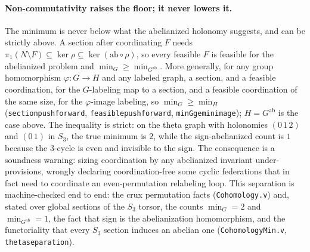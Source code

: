 \documentclass[11pt,a4paper]{article}
\theoremstyle{plain}
\theoremstyle{definition}
\theoremstyle{remark}
\renewcommand{\_}{\origunderscore\allowbreak}
\begin{document}
\paragraph{Non-commutativity raises the floor; it never lowers it.} The minimum is never below what
the abelianized holonomy suggests, and can be strictly above. A section after coordinating $F$ needs
$\pi_1(N \setminus F) \subseteq \ker \rho \subseteq \ker(\mathrm{ab} \circ \rho)$, so every feasible
$F$ is feasible for the abelianized problem and $\min_G \ge \min_{G^{\mathrm{ab}}}$. More generally,
for any group homomorphism $\varphi : G \to H$ and any labeled graph, a section, and a feasible
coordination, for the $G$-labeling map to a section, and a feasible coordination of the same size, for
the $\varphi$-image labeling, so $\min_G \ge \min_H$ (\texttt{section\_pushforward},
\texttt{feasible\_pushforward}, \texttt{min\_G\_ge\_min\_image}); $H = G^{\mathrm{ab}}$ is the case
above. The inequality is
strict: on the theta graph with holonomies $(0\,1\,2)$ and $(0\,1)$ in $S_3$, the true minimum is
$2$, while the sign-abelianized count is $1$ because the $3$-cycle is even and invisible to the sign.
The consequence is a soundness warning: sizing coordination by any abelianized invariant
under-provisions, wrongly declaring coordination-free some cyclic federations that in fact need to
coordinate an even-permutation relabeling loop. This separation is machine-checked end to end: the
crux permutation facts (\texttt{Cohomology.v}) and, stated over global sections of the $S_3$ torsor,
the counts $\min_G = 2$ and $\min_{G^{\mathrm{ab}}} = 1$, the fact that sign is the abelianization
homomorphism, and the functoriality that every $S_3$ section induces an abelian one
(\texttt{CohomologyMin.v}, \texttt{theta\_separation}).
\end{document}
